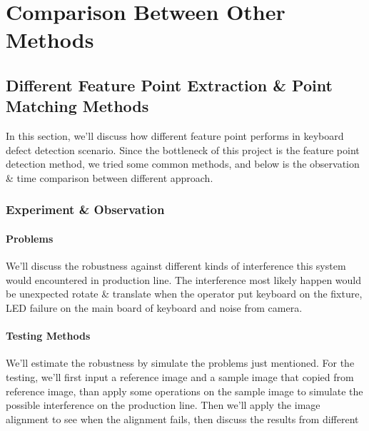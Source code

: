 \chapter{Comparison Between Other Methods}
\label{c:comparision}

\section{Different Feature Point Extraction \& Point Matching Methods}
	In this section, we'll discuss how different feature point performs in keyboard defect detection scenario.
	Since the bottleneck of this project is the feature point detection method, we tried some common methods, and below is the observation \& time comparison between different approach.
	\subsection{Experiment \& Observation}
		\subsubsection{Problems}
			We'll discuss the robustness against different kinds of interference this system would encountered in production line.
			The interference most likely happen would be 
			unexpected rotate \& translate when the operator put keyboard on the fixture, 
			LED failure on the main board of keyboard and noise from camera.
		\subsubsection{Testing Methods}
			We'll estimate the robustness by simulate the problems just mentioned. 
			For the testing, we'll first input a reference image and a sample image that copied from reference image, 
			than apply some operations on the sample image to simulate the possible interference on the production line.
			Then we'll apply the image alignment to see when the alignment fails, then discuss the results from different \\


